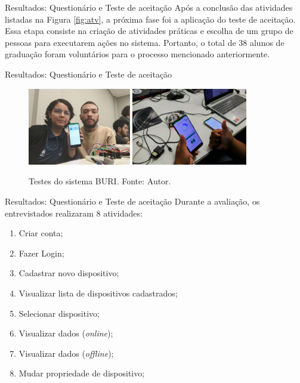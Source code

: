 \documentclass[12pt]{beamer}
\begin{document}
    \begin{frame}{Resultados: Questionário e Teste de aceitação}
        Após a conclusão das atividades listadas na Figura \ref{fig:atv}, a próxima fase foi 
        a aplicação do teste de aceitação. Essa etapa consiste na criação de atividades práticas e escolha de um 
        grupo de pessoas para executarem ações no sistema. Portanto, o total de 38 alunos de graduação foram voluntários 
        para o processo mencionado anteriormente.
    \end{frame}

    \begin{frame}{Resultados: Questionário e Teste de aceitação}
        \begin{figure}[ht]
            \centering
            \includegraphics[width=0.40\textwidth]{img/teste/app1.jpeg}
            \includegraphics[width=0.45\textwidth]{img/teste/hard2.jpeg}
            \caption{Testes do sistema BURI. Fonte: Autor.}\label{fig:testes-fotos}
        \end{figure}
    \end{frame}

    \begin{frame}{Resultados: Questionário e Teste de aceitação}
        Durante a avaliação, os entrevistados realizaram 8 atividades:
        \begin{enumerate}
            \item Criar conta;
            \item Fazer Login;
            \item Cadastrar novo dispositivo;
            \item Visualizar lista de dispositivos cadastrados;
            \item Selecionar dispositivo;
            \item Visualizar dados (\textit{online});
            \item Visualizar dados (\textit{offline});
            \item Mudar propriedade de dispositivo;
        \end{enumerate}
    \end{frame}
\end{document}
